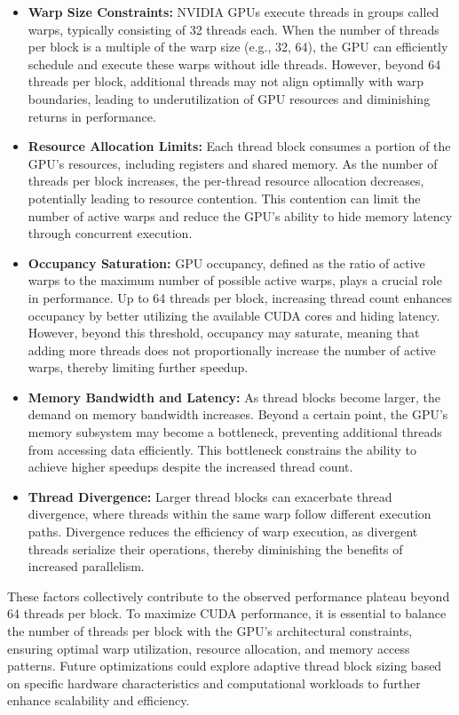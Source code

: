 \documentclass[
	report, %
	11pt, %
]{CSUniSchoolLabReport}
\newcounter{ct}
\begin{document}
\begin{itemize}
	\item \textbf{Warp Size Constraints:} NVIDIA GPUs execute threads in groups called warps, typically consisting of 32 threads each. When the number of threads per block is a multiple of the warp size (e.g., 32, 64), the GPU can efficiently schedule and execute these warps without idle threads. However, beyond 64 threads per block, additional threads may not align optimally with warp boundaries, leading to underutilization of GPU resources and diminishing returns in performance.

	\item \textbf{Resource Allocation Limits:} Each thread block consumes a portion of the GPU's resources, including registers and shared memory. As the number of threads per block increases, the per-thread resource allocation decreases, potentially leading to resource contention. This contention can limit the number of active warps and reduce the GPU's ability to hide memory latency through concurrent execution.

	\item \textbf{Occupancy Saturation:} GPU occupancy, defined as the ratio of active warps to the maximum number of possible active warps, plays a crucial role in performance. Up to 64 threads per block, increasing thread count enhances occupancy by better utilizing the available CUDA cores and hiding latency. However, beyond this threshold, occupancy may saturate, meaning that adding more threads does not proportionally increase the number of active warps, thereby limiting further speedup.

	\item \textbf{Memory Bandwidth and Latency:} As thread blocks become larger, the demand on memory bandwidth increases. Beyond a certain point, the GPU's memory subsystem may become a bottleneck, preventing additional threads from accessing data efficiently. This bottleneck constrains the ability to achieve higher speedups despite the increased thread count.

	\item \textbf{Thread Divergence:} Larger thread blocks can exacerbate thread divergence, where threads within the same warp follow different execution paths. Divergence reduces the efficiency of warp execution, as divergent threads serialize their operations, thereby diminishing the benefits of increased parallelism.
\end{itemize}

These factors collectively contribute to the observed performance plateau beyond 64 threads per block. To maximize CUDA performance, it is essential to balance the number of threads per block with the GPU's architectural constraints, ensuring optimal warp utilization, resource allocation, and memory access patterns. Future optimizations could explore adaptive thread block sizing based on specific hardware characteristics and computational workloads to further enhance scalability and efficiency.
\end{document}
